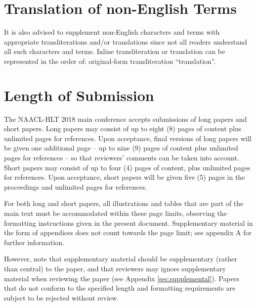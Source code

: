 \documentclass[11pt,a4paper]{article}
\begin{document}

\section{Translation of non-English Terms}

It is also advised to supplement non-English characters and terms
with appropriate transliterations and/or translations
since not all readers understand all such characters and terms.
Inline transliteration or translation can be represented in
the order of: original-form transliteration ``translation''.

\section{Length of Submission}
\label{sec:length}

The NAACL-HLT 2018 main conference accepts submissions of long papers and
short papers.
 Long papers may consist of up to eight (8) pages of
content plus unlimited pages for references. Upon acceptance, final
versions of long papers will be given one additional page -- up to nine (9)
pages of content plus unlimited pages for references -- so that reviewers' comments
can be taken into account. Short papers may consist of up to four (4)
pages of content, plus unlimited pages for references. Upon
acceptance, short papers will be given five (5) pages in the
proceedings and unlimited pages for references. 

For both long and short papers, all illustrations and tables that are part
of the main text must be accommodated within these page limits, observing
the formatting instructions given in the present document. Supplementary
material in the form of appendices does not count towards the page limit; see appendix A for further information.

However, note that supplementary material should be supplementary
(rather than central) to the paper, and that reviewers may ignore
supplementary material when reviewing the paper (see Appendix
\ref{sec:supplemental}). Papers that do not conform to the specified
length and formatting requirements are subject to be rejected without
review.
\end{document}
